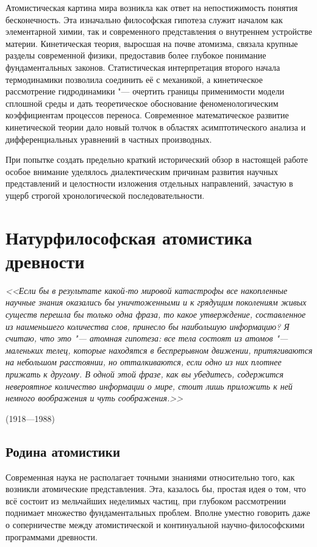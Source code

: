 \documentclass[a4paper, 12pt, oneside]{article} %
\begin{document}
Атомистическая картина мира возникла как ответ на непостижимость понятия
бесконечность. Эта изначально философская гипотеза служит началом как
элементарной химии, так и современного представления о внутреннем
устройстве материи. Кинетическая теория, выросшая на почве атомизма,
связала крупные разделы современной физики, предоставив более глубокое
понимание фундаментальных законов. Статистическая интерпретация второго
начала термодинамики позволила соединить её с механикой, а кинетическое
рассмотрение гидродинамики "--- очертить границы применимости модели
сплошной среды и дать теоретическое обоснование феноменологическим
коэффициентам процессов переноса. Современное математическое развитие
кинетической теории дало новый толчок в областях асимптотического
анализа и дифференциальных уравнений в частных производных.

При попытке создать предельно краткий исторический обзор в настоящей
работе особое внимание уделялось диалектическим причинам развития
научных представлений и целостности изложения отдельных направлений,
зачастую в ущерб строгой хронологической последовательности.

\section{Натурфилософская атомистика древности}

\epigraph{\textit{<<Если бы в результате какой-то мировой катастрофы все
накопленные научные знания оказались бы уничтоженными и к грядущим
поколениям живых существ перешла бы только одна фраза, то какое
утверждение, составленное из наименьшего количества слов, принесло бы
наибольшую информацию? Я считаю, что это "--- атомная гипотеза: все тела
состоят из атомов "--- маленьких телец, которые находятся в беспрерывном
движении, притягиваются на небольшом расстоянии, но отталкиваются, если
одно из них плотнее прижать к другому. В одной этой фразе, как вы
убедитесь, содержится невероятное количество информации о мире, стоит
лишь приложить к ней немного воображения и чуть
соображения.>>}}{ (1918---1988)}

\subsection{Родина атомистики}

Современная наука не располагает точными знаниями относительно того, как
возникли атомические представления. Эта, казалось бы, простая идея о
том, что всё состоит из мельчайших неделимых частиц, при глубоком
рассмотрении поднимает множество фундаментальных проблем. Вполне уместно
говорить даже о соперничестве между атомистической и континуальной
научно-философскими программами древности.
\end{document}

